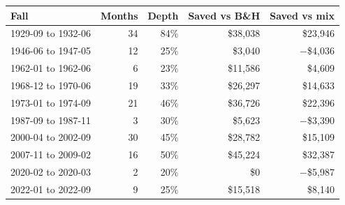 \begin{tabular}{lrrrr}
\toprule
Fall & Months & Depth & Saved vs B\&H & Saved vs mix \\
\midrule
1929-09 to 1932-06 & 34 & 84\% & \$38,038 & \$23,946 \\
1946-06 to 1947-05 & 12 & 25\% & \$3,040 & $-$\$4,036 \\
1962-01 to 1962-06 & 6 & 23\% & \$11,586 & \$4,609 \\
1968-12 to 1970-06 & 19 & 33\% & \$26,297 & \$14,633 \\
1973-01 to 1974-09 & 21 & 46\% & \$36,726 & \$22,396 \\
1987-09 to 1987-11 & 3 & 30\% & \$5,623 & $-$\$3,390 \\
2000-04 to 2002-09 & 30 & 45\% & \$28,782 & \$15,109 \\
2007-11 to 2009-02 & 16 & 50\% & \$45,224 & \$32,387 \\
2020-02 to 2020-03 & 2 & 20\% & \$0 & $-$\$5,987 \\
2022-01 to 2022-09 & 9 & 25\% & \$15,518 & \$8,140 \\
\bottomrule
\end{tabular}
